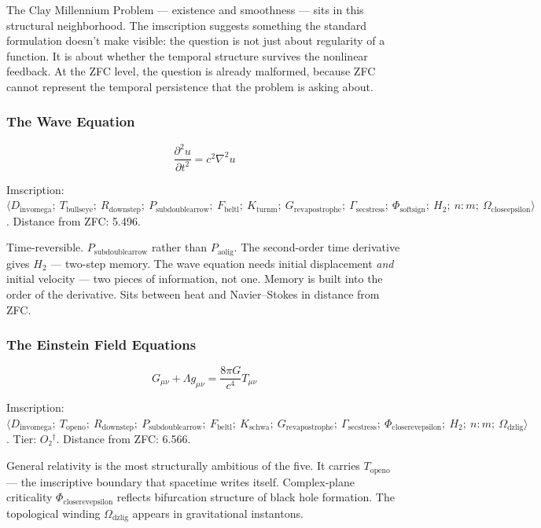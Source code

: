 \documentclass[12pt,a4paper]{article}
\begin{document}
The Clay Millennium Problem --- existence and smoothness --- sits in this structural neighborhood. The imscription suggests something the standard formulation doesn't make visible: the question is not just about regularity of a function. It is about whether the temporal structure survives the nonlinear feedback. At the ZFC level, the question is already malformed, because ZFC cannot represent the temporal persistence that the problem is asking about.

\subsubsection{The Wave Equation}

\[\frac{\partial^2 u}{\partial t^2} = c^2\nabla^2 u\]

Imscription: $\langle D_{\text{invomega}};\ T_{\text{bullseye}};\ R_{\text{downstep}};\ P_{\text{subdoublearrow}};\ F_{\text{beltl}};\ K_{\text{turnm}};\ G_{\text{revapostrophe}};\ \Gamma_{\text{secstress}};\ \Phi_{\text{softsign}};\ H_2;\ n{:}m;\ \Omega_{\text{closeepsilon}} \rangle$. Distance from ZFC: 5.496.

Time-reversible. $P_{\text{subdoublearrow}}$ rather than $P_{\text{aolig}}$. The second-order time derivative gives $H_2$ --- two-step memory. The wave equation needs initial displacement \emph{and} initial velocity --- two pieces of information, not one. Memory is built into the order of the derivative. Sits between heat and Navier--Stokes in distance from ZFC.

\subsubsection{The Einstein Field Equations}

\[G_{\mu\nu} + \Lambda g_{\mu\nu} = \frac{8\pi G}{c^4}T_{\mu\nu}\]

Imscription: $\langle D_{\text{invomega}};\ T_{\text{openo}};\ R_{\text{downstep}};\ P_{\text{subdoublearrow}};\ F_{\text{beltl}};\ K_{\text{schwa}};\ G_{\text{revapostrophe}};\ \Gamma_{\text{secstress}};\ \Phi_{\text{closerevepsilon}};\ H_2;\ n{:}m;\ \Omega_{\text{dzlig}} \rangle$. Tier: $O₂^\dagger$. Distance from ZFC: 6.566.

General relativity is the most structurally ambitious of the five. It carries $T_{\text{openo}}$ --- the imscriptive boundary that spacetime writes itself. Complex-plane criticality $\Phi_{\text{closerevepsilon}}$ reflects bifurcation structure of black hole formation. The topological winding $\Omega_{\text{dzlig}}$ appears in gravitational instantons.
\end{document}
